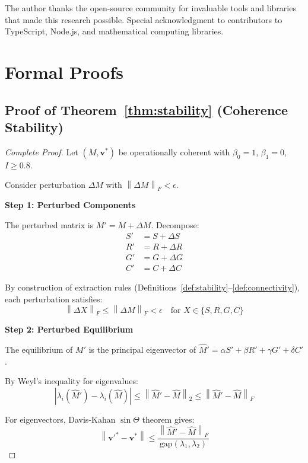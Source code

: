 \documentclass[11pt,a4paper]{article}
\theoremstyle{definition}
\theoremstyle{remark}
\newcommand{\norm}[1]{\left\|#1\right\|}
\newcommand{\abs}[1]{\left|#1\right|}
\newcommand{\gap}{\text{gap}}
\begin{document}
The author thanks the open-source community for invaluable tools and libraries that made this research possible. Special acknowledgment to contributors to TypeScript, Node.js, and mathematical computing libraries.

\appendix

\section{Formal Proofs}

\subsection{Proof of Theorem~\ref{thm:stability} (Coherence Stability)}

\begin{proof}[Complete Proof]
Let $(M, \mathbf{v}^*)$ be operationally coherent with $\beta_0 = 1$, $\beta_1 = 0$, $I \geq 0.8$.

Consider perturbation $\Delta M$ with $\norm{\Delta M}_F < \epsilon$.

\textbf{Step 1: Perturbed Components}

The perturbed matrix is $M' = M + \Delta M$. Decompose:
\begin{align}
S' &= S + \Delta S \\
R' &= R + \Delta R \\
G' &= G + \Delta G \\
C' &= C + \Delta C
\end{align}

By construction of extraction rules (Definitions~\ref{def:stability}--\ref{def:connectivity}), each perturbation satisfies:
\begin{equation}
\norm{\Delta X}_F \leq \norm{\Delta M}_F < \epsilon \quad \text{for } X \in \{S, R, G, C\}
\end{equation}

\textbf{Step 2: Perturbed Equilibrium}

The equilibrium of $M'$ is the principal eigenvector of $\hat{M}' = \alpha S' + \beta R' + \gamma G' + \delta C'$.

By Weyl's inequality for eigenvalues:
\begin{equation}
\abs{\lambda_i(\hat{M}') - \lambda_i(\hat{M})} \leq \norm{\hat{M}' - \hat{M}}_2 \leq \norm{\hat{M}' - \hat{M}}_F
\end{equation}

For eigenvectors, Davis-Kahan $\sin\Theta$ theorem gives:
\begin{equation}
\norm{\mathbf{v}'^* - \mathbf{v}^*} \leq \frac{\norm{\hat{M}' - \hat{M}}_F}{\gap(\lambda_1, \lambda_2)}
\end{equation}


\end{proof}
\end{document}
